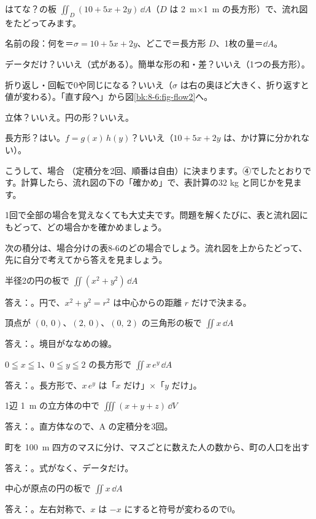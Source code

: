 はてな？の板 $\iint_D(10+5x+2y)\,\dd A$（$D$ は \qty{2}{m}×\qty{1}{m} の長方形）で、流れ図をたどってみます。
\begin{enumerate}[label={\bkcircled[\bkTT]{\arabic*}}, leftmargin=2.4\zw, itemsep=1pt, topsep=2pt]
\item 名前の段：何を＝$\sigma=10+5x+2y$、どこで＝長方形 $D$、1枚の量＝$\dd A$。
\item データだけ？\enspace いいえ（式がある）。\enspace 簡単な形の和・差？\enspace いいえ（1つの長方形）。
\item 折り返し・回転で0や同じになる？\enspace いいえ（$\sigma$ は右の奥ほど大きく、折り返すと値が変わる）。\enspace 「直す段へ」から図\ref{bk:8-6:fig-flow2}へ。
\item 立体？\enspace いいえ。\enspace 円の形？\enspace いいえ。
\item 長方形？\enspace はい。\enspace $f=g(x)\,h(y)$？\enspace いいえ（$10+5x+2y$ は、かけ算に分かれない）。
\end{enumerate}
こうして、場合 （定積分を2回、順番は自由）に決まります。④でしたとおりです。計算したら、流れ図の下の「確かめ」で、表計算の32 kg と同じかを見ます。

1回で全部の場合を覚えなくても大丈夫です。問題を解くたびに、表と流れ図にもどって、どの場合かを確かめましょう。

次の積分は、場合分けの表8-6のどの場合でしょう。流れ図を上からたどって、先に自分で考えてから答えを見ましょう。
\begin{enumerate}[label={\bkcircled[\bkTT]{\arabic*}}, leftmargin=2.4\zw, itemsep=3pt, topsep=2pt]
\item 半径2の円の板で $\iint(x^2+y^2)\,\dd A$\par\nobreak\noindent 答え：。円で、$x^2+y^2=r^2$ は中心からの距離 $r$ だけで決まる。
\item 頂点が $(0,\ 0)$、$(2,\ 0)$、$(0,\ 2)$ の三角形の板で $\iint x\,\dd A$\par\nobreak\noindent 答え：。境目がななめの線。
\item $0\leqq x\leqq1$、$0\leqq y\leqq2$ の長方形で $\iint x\,e^{y}\,\dd A$\par\nobreak\noindent 答え：。長方形で、$x\,e^{y}$ は「$x$ だけ」×「$y$ だけ」。
\item 1辺 \qty{1}{m} の立方体の中で $\iiint(x+y+z)\,\dd V$\par\nobreak\noindent 答え：。直方体なので、A の定積分を3回。
\item 町を \qty{100}{m} 四方のマスに分け、マスごとに数えた人の数から、町の人口を出す\par\nobreak\noindent 答え：。式がなく、データだけ。
\item 中心が原点の円の板で $\iint x\,\dd A$\par\nobreak\noindent 答え：。左右対称で、$x$ は $-x$ にすると符号が変わるので0。
\end{enumerate}

